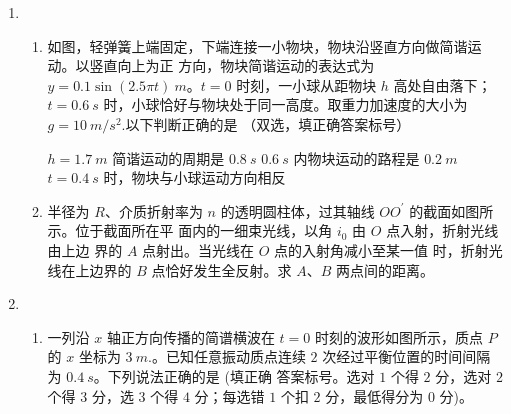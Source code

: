 \begin{enumerate}
\item 
{}
\begin{enumerate}
	\item
如图，轻弹簧上端固定，下端连接一小物块，物块沿竖直方向做简谐运动。以竖直向上为正
方向，物块简谐运动的表达式为 $ y=0.1 \sin (2.5 \pi t) \ m $。$ t=0 $ 时刻，一小球从距物块 $ h $ 高处自由落下；
$ t=0.6 \ s $ 时，小球恰好与物块处于同一高度。取重力加速度的大小为 $ g=10 \ m/s^{2} $.以下判断正确的是 \underlinegap 
（双选，填正确答案标号）
\begin{figure}[h!]
	\centering
	
\end{figure}

\fourchoices
{$ h=1.7 \ m $}
{简谐运动的周期是 $ 0.8 \ s $}
{$ 0.6 \ s $ 内物块运动的路程是 $ 0.2 \ m $}
{$ t=0.4 \ s $ 时，物块与小球运动方向相反}


\item 
半径为 $ R $、介质折射率为 $ n $ 的透明圆柱体，过其轴线 $ OO ^{\prime} $ 的截面如图所示。位于截面所在平
面内的一细束光线，以角 $ i_{0} $ 由 $ O $ 点入射，折射光线由上边
界的 $ A $ 点射出。当光线在 $ O $ 点的入射角减小至某一值
时，折射光线在上边界的 $ B $ 点恰好发生全反射。求 $ A $、$ B $
两点间的距离。
\begin{figure}[h!]
	\flushright
	
\end{figure}


	
\end{enumerate}

\item 
{}
\begin{enumerate}
	\item
一列沿 $ x $ 轴正方向传播的简谱横波在 $ t=0 $ 时刻的波形如图所示，质点 $ P $ 的 $ x $ 坐标为
$ 3 \ m $.。已知任意振动质点连续 $ 2 $ 次经过平衡位置的时间间隔为 $ 0.4 \ s $。下列说法正确的是
 \underlinegap 
(填正确
答案标号。选对 $ 1 $ 个得 $ 2 $ 分，选对 $ 2 $ 个得 $ 3 $ 分，选 $ 3 $ 个得 $ 4 $ 分；每选错 $ 1 $ 个扣 $ 2 $ 分，最低得分为 $ 0 $
分)。
\begin{figure}[h!]
	\centering
	
\end{figure}


\end{enumerate}
\end{enumerate}
